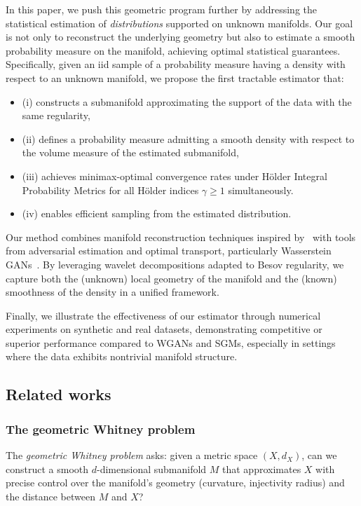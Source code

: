 \documentclass[10pt]{article}
\begin{document}
In this paper, we push this geometric program further by addressing the statistical estimation of \emph{distributions} supported on unknown manifolds. Our goal is not only to reconstruct the underlying geometry but also to estimate a smooth probability measure on the manifold, achieving optimal statistical guarantees. Specifically, given an iid sample of a probability measure having a density with respect to an unknown manifold, we propose the first tractable estimator that:
\begin{itemize}
    \item (i) constructs a submanifold approximating the support of the data with the same regularity,
    \item (ii) defines a probability measure admitting a smooth density with respect to the volume measure of the estimated submanifold,
    \item (iii) achieves minimax-optimal convergence rates under Hölder Integral Probability Metrics \citep{IPMsMuller} for all Hölder indices $\gamma \geq 1$ simultaneously.
    \item (iv) enables efficient sampling from the estimated distribution.
\end{itemize}

Our method combines manifold reconstruction techniques inspired by~\cite{fefferman2015reconstruction} with tools from adversarial estimation and optimal transport, particularly Wasserstein GANs~\citep{arjovsky2017wasserstein}. By leveraging wavelet decompositions adapted to Besov regularity, we capture both the (unknown) local geometry of the manifold and the (known) smoothness of the density in a unified framework. 

Finally, we illustrate the effectiveness of our estimator through numerical experiments on synthetic and real datasets, demonstrating competitive or superior performance compared to WGANs and SGMs, especially in settings where the data exhibits nontrivial manifold structure.


\subsection{Related works}
\subsubsection{The geometric Whitney problem}

The \emph{geometric Whitney problem} asks: given a metric space \( (X,d_X) \), can we construct a smooth \( d \)-dimensional submanifold \( M \) that approximates \( X \) with precise control over the manifold’s geometry (curvature, injectivity radius) and the distance between \( M \) and \( X \)?
\end{document}
